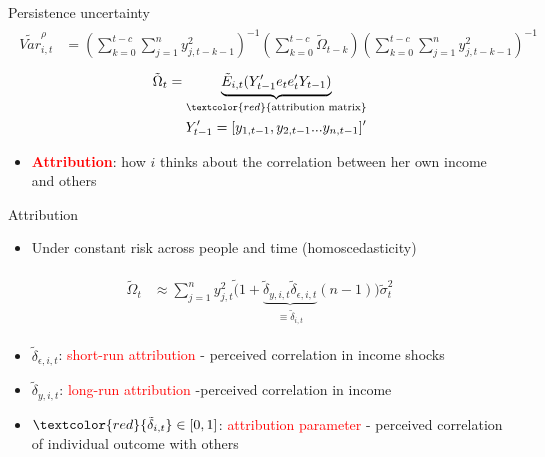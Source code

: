\documentclass{beamer}
\begin{document}
\begin{frame}{Persistence uncertainty}
	\begin{eqnarray}
	\begin{split}
	\tilde {Var}^{\rho}_{i,t} & =   (\sum^{t-c}_{k=0}\sum^{n}_{j=1}y^2_{j,t-k-1})^{-1}(\sum^{t-c}_{k=0}\tilde \Omega_{t-k})(\sum^{t-c}_{k=0}\sum^{n}_{j=1}y^2_{j,t-k-1})^{-1}
	\end{split}
	\end{eqnarray}
	\begin{eqnarray}
	\begin{split}
	\tilde \Omega_{t} = \underbrace{\tilde E_{i,t}(Y'_{t-1}e_{t}e_{t}'Y_{t-1})}_{\textcolor{red}{\text{attribution matrix}}} \\
	Y'_{t-1} = [y_{1,t-1},y_{2,t-1}...y_{n,t-1}]'
	\end{split}
	\end{eqnarray}
	\begin{itemize}	  
		\item \textbf{\textcolor{red}{Attribution}}: how $i$ thinks about the correlation between her own income and others
	\end{itemize}
\end{frame}


\begin{frame}{Attribution}
	
	\begin{itemize}
		\item Under constant risk across people and time (homoscedasticity)
	\end{itemize}
	\begin{eqnarray}
	\begin{split}
	\tilde \Omega_{t}  & \approx \sum^{n}_{j=1}y^2_{j,t} \tilde (1+\underbrace{\tilde \delta_{y,i,t}\tilde \delta_{\epsilon,i,t}}_{\equiv \tilde \delta_{i,t}}(n-1)) \tilde \sigma^2_{t} 
	\end{split}
	\end{eqnarray}
	\begin{itemize}
		\item $\tilde \delta_{\epsilon, i,t}$: \textcolor{red}{short-run attribution} -  perceived correlation in income shocks 
		\item $\tilde \delta_{y, i,t}$: \textcolor{red}{long-run attribution} -perceived correlation in income 
		\item $\textcolor{red}{\tilde \delta_{i,t}} \in [0,1]$: \textcolor{red}{attribution parameter} - perceived correlation of individual outcome with others 
	\end{itemize}
\end{frame}
\end{document}
